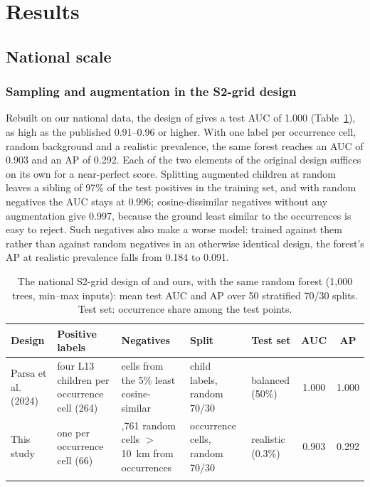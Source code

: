 \documentclass[pdflatex,sn-apa]{sn-jnl}
\begin{document}
\section{Results}\label{sec:results}

\subsection{National scale}\label{sec:res-national}

\subsubsection{Sampling and augmentation in the S2-grid design}\label{sec:res-ladder}

Rebuilt on our national data, the design of \citet{Parsa2024} gives a test AUC of 1.000 (Table~\ref{tab:nat-design}), as high as the published 0.91--0.96 or higher. With one label per occurrence cell, random background and a realistic prevalence, the same forest reaches an AUC of 0.903 and an AP of 0.292. Each of the two elements of the original design suffices on its own for a near-perfect score. Splitting augmented children at random leaves a sibling of 97\% of the test positives in the training set, and with random negatives the AUC stays at 0.996; cosine-dissimilar negatives without any augmentation give 0.997, because the ground least similar to the occurrences is easy to reject. Such negatives also make a worse model: trained against them rather than against random negatives in an otherwise identical design, the forest's AP at realistic prevalence falls from 0.184 to 0.091.

\begin{table}[t]
\caption{The national S2-grid design of \citet{Parsa2024} and ours, with the same random forest (1,000 trees, min--max inputs): mean test AUC and AP over 50 stratified 70/30 splits. Test set: occurrence share among the test points.}\label{tab:nat-design}
\scriptsize
\setlength{\tabcolsep}{2.5pt}
\begin{tabular*}{\textwidth}{@{\extracolsep\fill}>{\raggedright\arraybackslash}p{1.8cm}>{\raggedright\arraybackslash}p{2.6cm}>{\raggedright\arraybackslash}p{2.7cm}>{\raggedright\arraybackslash}p{1.9cm}>{\raggedright\arraybackslash}p{1.4cm}cc}
\toprule
Design & Positive labels & Negatives & Split & Test set & AUC & AP \\
\midrule
Parsa et al. (2024) & four L13 children per occurrence cell (264) & 264 cells from the 5\% least cosine-similar & child labels, random 70/30 & balanced (50\%) & 1.000 & 1.000 \\
This study & one per occurrence cell (66) & 34,761 random cells $>$10~km from occurrences & occurrence cells, random 70/30 & realistic (0.3\%) & 0.903 & 0.292 \\
\botrule
\end{tabular*}
\end{table}
\end{document}
